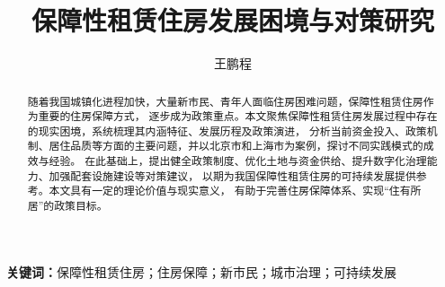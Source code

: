 \documentclass[UTF8]{ctexart}
\title{保障性租赁住房发展困境与对策研究}
\author{王鹏程}
\date{}
\begin{document}
\maketitle

\begin{abstract}
随着我国城镇化进程加快，大量新市民、青年人面临住房困难问题，保障性租赁住房作为重要的住房保障方式，
逐步成为政策重点。本文聚焦保障性租赁住房发展过程中存在的现实困境，系统梳理其内涵特征、发展历程及政策演进，
分析当前资金投入、政策机制、居住品质等方面的主要问题，并以北京市和上海市为案例，探讨不同实践模式的成效与经验。
在此基础上，提出健全政策制度、优化土地与资金供给、提升数字化治理能力、加强配套设施建设等对策建议，
以期为我国保障性租赁住房的可持续发展提供参考。本文具有一定的理论价值与现实意义，
有助于完善住房保障体系、实现“住有所居”的政策目标。
\end{abstract}

{\small\textbf{关键词：}保障性租赁住房；住房保障；新市民；城市治理；可持续发展}










 
\end{document}
